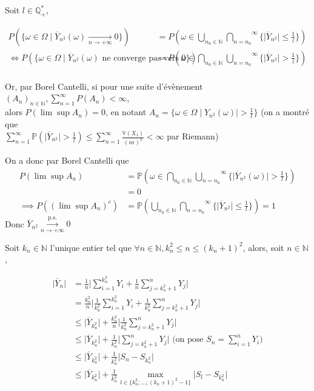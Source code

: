 \documentclass[12pt]{article}
\newcommand{\petitespace}{\vspace{0.5cm}}
\newcommand{\bb}[1]{\mathbb{#1}} %
\newcommand{\N}{\bb{N}}%
\newcommand{\Q}{\bb{Q}}%
\renewcommand{\P}{\bb{P}}%
\newcommand{\union}[2]{\overset{#2}{\underset{#1}{\bigcup}}} %
\newcommand{\inter}[2]{\overset{#2}{\underset{#1}{\bigcap}}} %
\newcommand{\somme}[2]{\sum\limits_{#1}^{#2}}
\newcommand{\Var}[1]{\bb{ V} \mathopen{}\left(#1\right)} %
\newcommand{\1}{\bb{1}} %
\newcommand{\cvn}{\underset{n\rightarrow+\infty}{\longrightarrow}} %
\newcommand{\cvps}{\overset{\text{p.s.}}{\cvn}} %
\begin{document}
{Soit $l \in \Q^*_+$, 

\begin{align*}
	P(\{\omega \in \Omega \mid \overline Y_{n^2}(\omega) \cvn 0\})&=P(\omega \in \union{n_0 \in \N}{}\inter{n=n_0}{\infty}\{\lvert \overline Y_{n^2}\rvert \le \frac{1}{l}\})\\
	\iff P(\{\omega \in \Omega \mid \overline Y_{n^2}(\omega) \text{  ne converge pas vers 0}\}) &= P(\omega \in \inter{n_0 \in \N}{}\union{n=n_0}{\infty}\{\lvert \overline Y_{n^2}\rvert > \frac{1}{l}\})\\
\end{align*}

Or, par Borel Cantelli, si pour une suite d'évènement $(A_n)_{n \in \N}, \somme{n=1}{\infty} P(A_n) <\infty$, \\alors $P(\lim\sup A_n)=0$, en notant $A_n = \{\omega \in \Omega \mid Y_{n^2}(\omega)\rvert > \frac{1}{l}\}$ (on a montré que \\$\somme{n=1}{\infty}\P(\lvert \overline Y_{n^2}\rvert >\frac{1}{l}) \le \somme{n=1}{\infty}\frac{\Var{X_1}}{(n\epsilon)^2} <\infty$ par Riemann)

On a donc par Borel Cantelli que 
\begin{align*}
	P(\lim\sup A_n)&=\P(\omega \in \inter{n_0 \in \N}{}\union{n=n_0}{\infty}\{\lvert \overline Y_{n^2}(\omega)\rvert > \frac{1}{l}\})\\
	&=0\\
	\implies P((\lim\sup A_n)^c)&=\P( \union{n_0 \in \N}{}\inter{n=n_0}{\infty}\{\lvert \overline Y_{n^2}\rvert \le \frac{1}{l}\})=1
\end{align*}
Donc $\overline Y_{n^2} \cvps 0$\petitespace

Soit $k_n \in \N$ l'unique entier tel que $\forall n \in \N, k_n^2\le n \le (k_n+1)^2$, alors, soit $n \in \N$,

\begin{align*}
	\lvert \overline Y_{n}\rvert &= \frac{1}{n}\lvert \somme{i=1}{k_n^2}Y_i+\frac{1}{n}\somme{j=k_n^2+1}{n}Y_j\rvert\\
	&=\frac{k_n^2}{n}\lvert \frac{1}{k_n^2}\somme{i=1}{k_n^2}Y_i+\frac{1}{k_n^2}\somme{j=k_n^2+1}{n}Y_j\rvert\\
	&\le\lvert \overline Y_{k_n^2}\rvert + \frac{k_n^2}{n}\lvert \frac{1}{k_n^2}\somme{j=k_n^2+1}{n}Y_j\rvert\\
	&\le  \lvert\overline Y_{k_n^2}\rvert + \frac{1}{k_n^2}\lvert \somme{j=k_n^2+1}{n}Y_j \rvert \text{    (on pose $S_n = \somme{i=1}{n}Y_i$)}\\
	&\le \lvert\overline Y_{k_n^2}\rvert + \frac{1}{k_n^2}\lvert S_n-S_{k_n^2}\rvert\\
	&\le \lvert\overline Y_{k_n^2}\rvert + \frac{1}{k_n^2}\max\limits_{l \in \{k_n^2;...;(k_n+1)^2-1\} }\rvert S_l-S_{k_n^2}\rvert
\end{align*}


}
\end{document}
